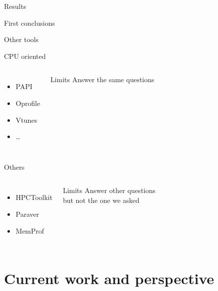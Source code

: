 \documentclass[xcolor={usenames,dvipsnames}]{beamer}
\newcommand{\sectiontitle}{}
\newcommand{\newsection}[1]{\renewcommand{\sectiontitle}{#1}\section{#1}}
\begin{document}
\begin{frame}{Results}
\begin{textblock}{14}
{\begin{alertblock}{First conclusions}
\begin{itemize}
                \end{itemize}
            \end{alertblock}
        }
    \end{textblock}
\end{frame}

\begin{frame}{Other tools}
    \begin{block}{CPU oriented}
        \begin{columns}
            \begin{itemize}
                \item PAPI \cite{Weaver13PAPI}
                \item Oprofile \cite{Oprofile}
                \item Vtunes \cite{Reinders05VTune}
                \item \dots
            \end{itemize}
            \begin{alertblock}{Limits}
                Answer the same questions
            \end{alertblock}
        \end{columns}
    \end{block}
    {
        \begin{block}{Others}
            \begin{columns}
                \begin{itemize}
                    \item HPCToolkit \cite{Adhianto10HPCTOOLKIT}
                    \item Paraver \cite{Pillet95PARAVER}
                    \item MemProf \cite{Lachaize12MemProf}
                \end{itemize}
                \begin{alertblock}{Limits}
                    Answer other questions \\but not the one we asked
                \end{alertblock}
            \end{columns}

        \end{block}
    }
\end{frame}
\newsection{Current work and perspective}
\end{document}
